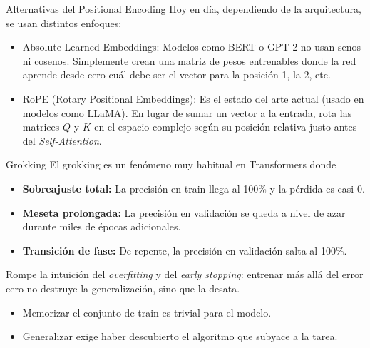 \begin{frame}{Alternativas del Positional Encoding}
 Hoy en día, dependiendo de la arquitectura, se usan distintos enfoques:

\begin{itemize}
    \item \alert{Absolute Learned Embeddings:} Modelos como BERT o GPT-2 no usan senos ni cosenos. Simplemente crean una matriz de pesos entrenables donde la red \alert{aprende} desde cero cuál debe ser el vector para la posición 1, la 2, etc.
    \item \alert{RoPE (Rotary Positional Embeddings):} Es el estado del arte actual (usado en modelos como LLaMA). En lugar de sumar un vector a la entrada, rota las matrices $Q$ y $K$ en el espacio complejo según su posición relativa justo antes del \textit{Self-Attention}.
\end{itemize}
\end{frame}
 
\begin{frame}{Grokking}
El grokking es un fenómeno muy habitual en Transformers \cite{power2022grokking} donde
\begin{itemize}
    \item \textbf{Sobreajuste total:} La precisión en train llega al \alert{100\%} y la pérdida es casi $0$.
    \item \textbf{Meseta prolongada:} La precisión en validación se queda \alert{a nivel de azar} durante miles de épocas adicionales.
    \item \textbf{Transición de fase:} De repente, la precisión en validación \alert{salta al 100\%}.
\end{itemize}

Rompe la intuición del \textit{overfitting} y del \textit{early stopping}: entrenar más allá del error cero no destruye la generalización, sino que la \alert{desata}.

\begin{itemize}
    \item Memorizar el conjunto de train es \alert{trivial} para el modelo.
    \item Generalizar exige haber \alert{descubierto el algoritmo} que subyace a la tarea.
\end{itemize}
\end{frame}
 
